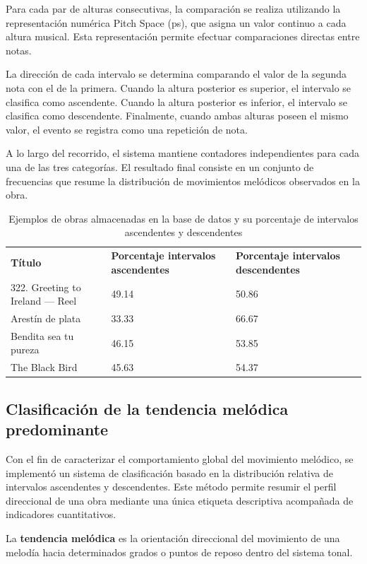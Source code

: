 Para cada par de alturas consecutivas, la comparación se realiza utilizando la representación numérica Pitch Space (ps), que asigna un valor continuo a cada altura musical. Esta representación permite efectuar comparaciones directas entre notas.

La dirección de cada intervalo se determina comparando el valor de la segunda nota con el de la primera. Cuando la altura posterior es superior, el intervalo se clasifica como ascendente. Cuando la altura posterior es inferior, el intervalo se clasifica como descendente. Finalmente, cuando ambas alturas poseen el mismo valor, el evento se registra como una repetición de nota.

A lo largo del recorrido, el sistema mantiene contadores independientes para cada una de las tres categorías. El resultado final consiste en un conjunto de frecuencias que resume la distribución de movimientos melódicos observados en la obra.

\begin{table}[H]
\centering
\begin{tabular}{l p{4cm} p{4cm}}
\textbf{Título} & \textbf{Porcentaje intervalos ascendentes} & \textbf{Porcentaje intervalos descendentes} \\
322.  Greeting to Ireland — Reel & 49.14 & 50.86 \\
Arestín de plata & 33.33 & 66.67 \\
Bendita sea tu pureza & 46.15 & 53.85 \\
The Black Bird & 45.63 & 54.37 \\
\end{tabular}
\caption{Ejemplos de obras almacenadas en la base de datos y su porcentaje de intervalos ascendentes y descendentes}
\end{table}

\subsection{Clasificación de la tendencia melódica predominante}
Con el fin de caracterizar el comportamiento global del movimiento melódico, se implementó un sistema de clasificación basado en la distribución relativa de intervalos ascendentes y descendentes. Este método permite resumir el perfil direccional de una obra mediante una única etiqueta descriptiva acompañada de indicadores cuantitativos.

La \textbf{tendencia melódica} es la orientación direccional del movimiento de una melodía hacia determinados grados o puntos de reposo dentro del sistema tonal.

